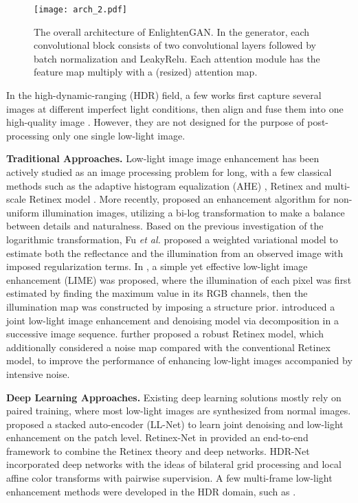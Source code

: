 \documentclass[journal]{IEEEtran}
\begin{document}
\begin{figure*}
\centering
\texttt{[image: arch\_2.pdf]}
\caption{The overall architecture of EnlightenGAN. In the generator, each convolutional block consists of two    convolutional layers followed by batch normalization and LeakyRelu. Each attention module has the feature map multiply with a (resized) attention map.}
\label{fig:architecture}
\end{figure*}



In the high-dynamic-ranging (HDR) field, a few works first capture several images at different imperfect light conditions, then align and fuse them into one high-quality image \cite{kalantari2017deep,wu2018deep}. However, they are not designed for the purpose of post-processing only one single low-light image. 

\noindent\textbf{Traditional Approaches.} Low-light image image enhancement has been actively studied as an image processing problem for long, with a few classical methods such as 
the adaptive histogram equalization (AHE) \cite{pizer1987adaptive}, Retinex \cite{land1977retinex} and multi-scale Retinex model \cite{jobson1997multiscale}. 
More recently, \cite{wang2013naturalness} proposed an enhancement algorithm for non-uniform illumination images, utilizing a bi-log transformation to make a balance between details and naturalness. Based on the previous investigation of the logarithmic transformation, Fu \textit{et al.} proposed a weighted variational model \cite{fu2016weighted} to estimate both the reflectance and the illumination from an observed image with imposed regularization terms. In \cite{guo2017lime}, a simple yet effective low-light image enhancement (LIME) was proposed, where the illumination of each pixel was first estimated by finding the maximum value in its RGB channels, then the illumination map was constructed by imposing a structure prior. \cite{ren2018joint} introduced a joint low-light image enhancement and denoising model via decomposition in a successive image sequence. \cite{li2018structure} further proposed a robust Retinex model, which additionally considered
a noise map compared with the conventional Retinex
model, to improve the performance of enhancing low-light images
accompanied by intensive noise.


\noindent\textbf{Deep Learning Approaches. }
Existing deep learning solutions mostly rely on paired training, where most low-light images are synthesized from normal images. \cite{lore2017llnet} proposed a stacked auto-encoder (LL-Net) to learn joint denoising and low-light enhancement on the patch level. Retinex-Net in \cite{wei2018deep} provided an end-to-end framework to combine the Retinex theory and deep networks. HDR-Net \cite{gharbi2017deep} incorporated deep networks with the ideas of bilateral grid processing and local affine color transforms with pairwise supervision. A few multi-frame low-light enhancement methods were developed in the HDR domain, such as \cite{kalantari2017deep,wu2018deep,cai2018learning}. 
\end{document}
